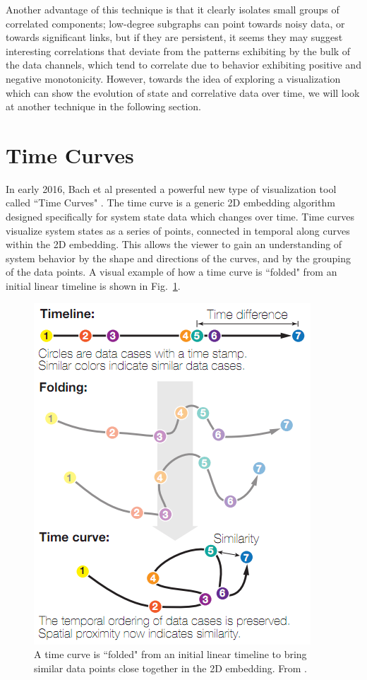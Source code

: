 Another advantage of this technique is that it clearly isolates small groups of correlated components; low-degree subgraphs can point towards noisy data, or towards significant links, but if they are persistent, it seems they may suggest interesting correlations that deviate from the patterns exhibiting by the bulk of the data channels, which tend to correlate due to behavior exhibiting positive and negative monotonicity. However, towards the idea of exploring a visualization which can show the evolution of state and correlative data over time, we will look at another technique in the following section.

\section{Time Curves}

In early 2016, Bach et al presented a powerful new type of visualization tool called ``Time Curves" \cite{bach2016time}. The time curve is a generic 2D embedding algorithm designed specifically for system state data which changes over time. Time curves visualize system states as a series of points, connected in temporal along curves within the 2D embedding. This allows the viewer to gain an understanding of system behavior by the shape and directions of the curves, and by the grouping of the data points. A visual example of how a time curve is ``folded" from an initial linear timeline is shown in Fig.~\ref{fig:time_curve_example}.

\begin{figure}[h]
\centering
    \includegraphics[width=0.5\columnwidth]{images/time_curve_example.png}
    \caption{A time curve is ``folded" from an initial linear timeline to bring similar data points close together in the 2D embedding. From \cite{bach2016time}.}
    \label{fig:time_curve_example}
\end{figure}


